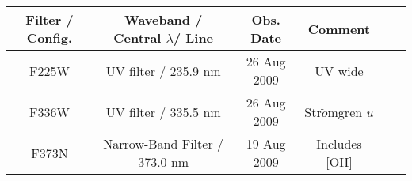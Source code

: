 \documentclass[11pt,fleqn]{book} %
\begin{document}
																																																																																																																																																																						\begin{table}[h]
																																																																																																																																																																						  \centering
																																																																																																																																																																						    \begin{tabular}{ c c c c c c }
																																																																																																																																																																						        \hline\hline
																																																																																																																																																																							    Filter / Config. & Waveband / Central $\lambda$/ Line & Obs. Date & Comment \\
																																																																																																																																																																							        \hline
																																																																																																																																																																								    F225W & UV filter / 235.9 nm & 26 Aug 2009 &  UV wide\\
																																																																																																																																																																								        
																																																																																																																																																																									    F336W & UV filter / 335.5 nm & 26 Aug 2009 & Str$\ddot{o}$mgren $u$\\
																																																																																																																																																																									        
																																																																																																																																																																										    F373N & Narrow-Band Filter / 373.0 nm & 19 Aug 2009 & Includes \textsc{[OII]}\\
																																																																																																																																																																										        

\end{tabular}
\end{table}
\end{document}
